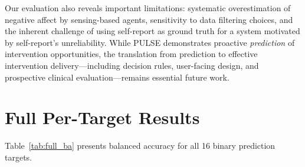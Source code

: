 \documentclass[screen,review,anonymous]{acmart}
\newcommand{\sysshort}{PULSE}
\begin{document}
Our evaluation also reveals important limitations: systematic overestimation of negative affect by sensing-based agents, sensitivity to data filtering choices, and the inherent challenge of using self-report as ground truth for a system motivated by self-report's unreliability. While \sysshort{} demonstrates proactive \emph{prediction} of intervention opportunities, the translation from prediction to effective intervention delivery---including decision rules, user-facing design, and prospective clinical evaluation---remains essential future work.

\begin{acks}
\end{acks}




\appendix

\section{Full Per-Target Results}
\label{app:full_results}

Table~\ref{tab:full_ba} presents balanced accuracy for all 16 binary prediction targets.
\end{document}

